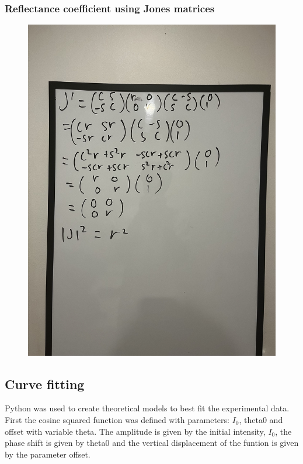 \documentclass{article}
\begin{document}
\subsubsection{Reflectance coefficient using Jones matrices} \label{eq:derivation2}
\begin{figure}[H]
    \centering
    \includegraphics[width=1.2\textwidth,angle=270,origin=c]{reflectance.jpg}
\end{figure}

\subsection{Curve fitting}

Python was used to create theoretical models to best fit the 
experimental data. First the cosine squared function was defined 
with parameters: $I_0$, theta0 and offset with variable theta. The 
amplitude is given by the initial intensity, $I_0$, the phase shift 
is given by theta0 and the vertical displacement of the funtion 
is given by the parameter offset.
\end{document}
